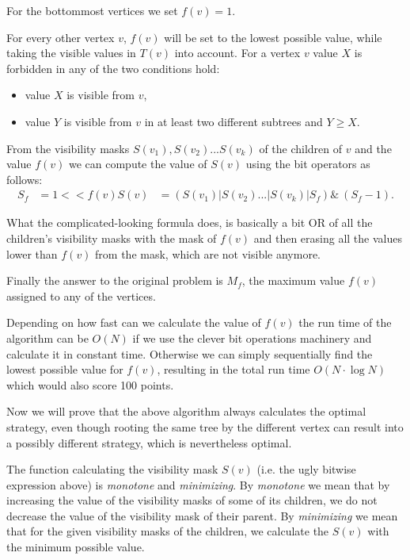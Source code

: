 For the bottommost vertices we set $f(v) = 1$.

For every other vertex $v$, $f(v)$ will be set to the lowest possible value, while
taking the visible values in $T(v)$ into account. For a vertex $v$ value $X$ is
forbidden in any of the two conditions hold:
\begin{itemize}
\item value $X$ is visible from $v$,
\item value $Y$ is visible from $v$ in at least two different subtrees and $Y \ge X$.
\end{itemize}

From the visibility masks $S(v_1), S(v_2) ... S(v_k)$ of the children of $v$ and the value $f(v)$
we can compute the value of $S(v)$ using the bit operators as follows:
\begin{align}
S_f &= 1 << f(v)
S(v) &= (S(v_1) | S(v_2) ... | S(v_k) | S_f) \& ~(S_f - 1).
\end{align}

What the complicated-looking formula does, is basically a bit OR of all the
children's visibility masks with the mask of $f(v)$ and then erasing all the
values lower than $f(v)$ from the mask, which are not visible anymore.

Finally the answer to the original problem is $M_f$, the maximum value $f(v)$ assigned
to any of the vertices.

Depending on how fast can we calculate the value of $f(v)$ the run time of the
algorithm can be $O(N)$ if we use the clever bit operations machinery and
calculate it in constant time. Otherwise we can simply sequentially find the lowest
possible value for $f(v)$, resulting in the total run time $O(N \cdot \log N)$ which
would also score 100 points.



Now we will prove that the above algorithm always calculates the optimal strategy,
even though rooting the same tree by the different vertex can result into a possibly
different strategy, which is nevertheless optimal.

The function calculating the visibility mask $S(v)$ (i.e. the ugly bitwise expression above)
is \emph{monotone} and \emph{minimizing}. By \emph{monotone} we mean that by increasing
the value of the visibility masks of some of its children, we do not decrease
the value of the visibility mask of their parent. By \emph{minimizing} we mean
that for the given visibility masks of the children, we calculate the $S(v)$ with
the minimum possible value.

